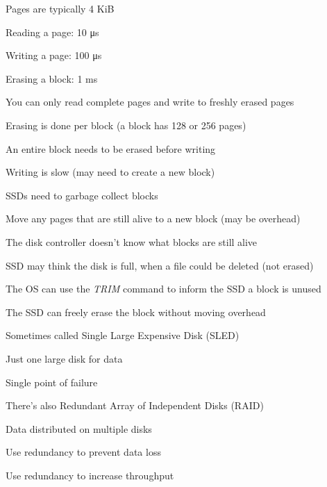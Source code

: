 \begin{slide}
  

  Pages are typically 4 KiB
  \medskip

  Reading a page: 10 μs

  Writing a page: 100 μs

  Erasing a block: 1 ms
\end{slide}

\begin{slide}
  

  You can only read complete pages and write to freshly erased pages
  \medskip

  Erasing is done per block (a block has 128 or 256 pages)

  \leftspace{}An entire block needs to be erased before writing
  \medskip

  Writing is slow (may need to create a new block)

\end{slide}

\begin{slide}
  

  SSDs need to garbage collect blocks

  \leftspace{}Move any pages that are still alive to a new block (may be overhead)
  \medskip

  The disk controller doesn't know what blocks are still alive

  \leftspace{}SSD may think the disk is full, when a file could be deleted (not erased)
  \medskip

  The OS can use the \textit{TRIM} command to inform the SSD a block is unused

  \leftspace{}The SSD can freely erase the block without moving overhead

\end{slide}

\begin{slide}
  

  Sometimes called Single Large Expensive Disk (SLED)

  \leftspace{}Just one large disk for data

  \leftspace{}\leftspace{}Single point of failure
  \medskip

  There's also Redundant Array of Independent Disks (RAID)

  \leftspace{}Data distributed on multiple disks

  \leftspace{}\leftspace{}Use redundancy to prevent data loss

  \leftspace{}\leftspace{}Use redundancy to increase throughput

\end{slide}

